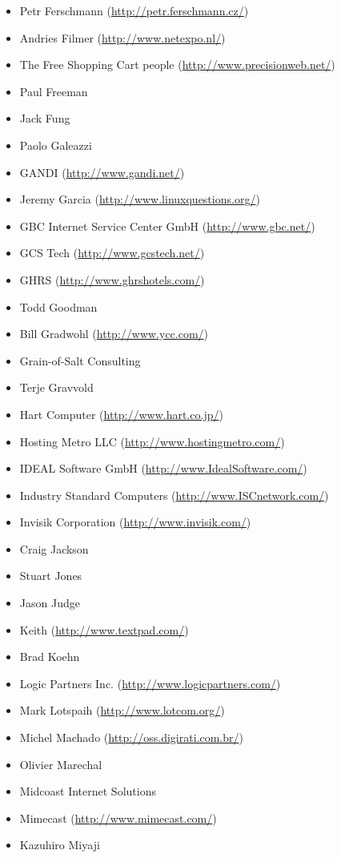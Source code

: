 \documentclass[a4paper,titlepage,12pt]{article}
\begin{document}
\begin{itemize}
	\item Petr Ferschmann (\url{http://petr.ferschmann.cz/})
	\item Andries Filmer (\url{http://www.netexpo.nl/})
	\item The Free Shopping Cart people (\url{http://www.precisionweb.net/})
	\item Paul Freeman
	\item Jack Fung
	\item Paolo Galeazzi
	\item GANDI (\url{http://www.gandi.net/})
	\item Jeremy Garcia (\url{http://www.linuxquestions.org/})
	\item GBC Internet Service Center GmbH (\url{http://www.gbc.net/})
	\item GCS Tech (\url{http://www.gcstech.net/})
	\item GHRS (\url{http://www.ghrshotels.com/})
	\item Todd Goodman
	\item Bill Gradwohl (\url{http://www.ycc.com/})
	\item Grain-of-Salt Consulting
	\item Terje Gravvold
	\item Hart Computer (\url{http://www.hart.co.jp/})
	\item Hosting Metro LLC (\url{http://www.hostingmetro.com/})
	\item IDEAL Software GmbH (\url{http://www.IdealSoftware.com/})
	\item Industry Standard Computers (\url{http://www.ISCnetwork.com/})
	\item Invisik Corporation (\url{http://www.invisik.com/})
	\item Craig Jackson
	\item Stuart Jones
	\item Jason Judge
	\item Keith (\url{http://www.textpad.com/})
	\item Brad Koehn
	\item Logic Partners Inc. (\url{http://www.logicpartners.com/})
	\item Mark Lotspaih (\url{http://www.lotcom.org/})
	\item Michel Machado (\url{http://oss.digirati.com.br/})
	\item Olivier Marechal
	\item Midcoast Internet Solutions
	\item Mimecast (\url{http://www.mimecast.com/})
	\item Kazuhiro Miyaji

\end{itemize}
\end{document}
